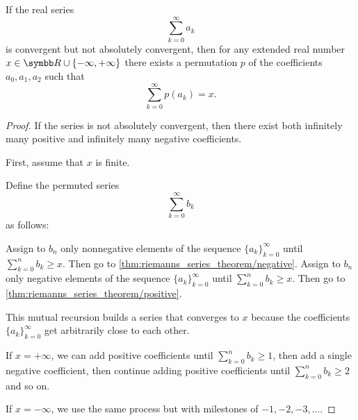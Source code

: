 \begin{theorem}\label{thm:riemanns_series_permutation_theorem}\cite[]{Фихтенгольц1968/2}
  If the real series
  \begin{equation*}
    \sum_{k=0}^\infty a_k
  \end{equation*}
  is convergent but not absolutely convergent, then for any extended real number \( x \in \R \cup \{ -\infty, +\infty \} \) there exists a permutation \( p \) of the coefficients \( a_0, a_1, a_2 \)
  such that
  \begin{equation*}
    \sum_{k=0}^\infty p(a_k) = x.
  \end{equation*}
\end{theorem}
\begin{proof}
  If the series is not absolutely convergent, then there exist both infinitely many positive and infinitely many negative coefficients.

  First, assume that \( x \) is finite.

  Define the permuted series
  \begin{equation*}
    \sum_{k=0}^\infty b_k
  \end{equation*}
  as follows:
  \begin{algenum}
     Assign to \( b_n \) only nonnegative elements of the sequence \( \{ a_k \}_{k=0}^\infty \) until \( \sum_{k=0}^n b_k \geq x \). Then go to \cref{thm:riemanns_series_theorem/negative}.
     Assign to \( b_n \) only negative elements of the sequence \( \{ a_k \}_{k=0}^\infty \) until \( \sum_{k=0}^n b_k \geq x \). Then go to \cref{thm:riemanns_series_theorem/positive}.
  \end{algenum}

  This mutual recursion builds a series that converges to \( x \) because the coefficients \( \{ a_k \}_{k=0}^\infty \) get arbitrarily close to each other.

  If \( x = +\infty \), we can add positive coefficients until \( \sum_{k=0}^n b_k \geq 1 \), then add a single negative coefficient, then continue adding positive coefficients until \( \sum_{k=0}^n b_k \geq 2 \) and so on.

  If \( x = -\infty \), we use the same process but with milestones of \( -1, -2, -3, \ldots \).
\end{proof}

